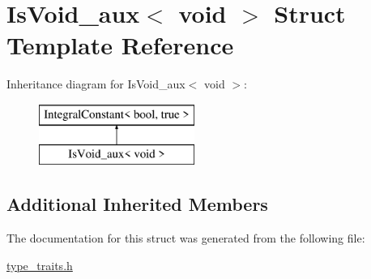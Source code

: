\hypertarget{struct_is_void__aux_3_01void_01_4}{}\section{Is\+Void\+\_\+aux$<$ void $>$ Struct Template Reference}
\label{struct_is_void__aux_3_01void_01_4}
Inheritance diagram for Is\+Void\+\_\+aux$<$ void $>$\+:\begin{figure}[H]
\begin{center}
\leavevmode
\includegraphics[height=2.000000cm]{struct_is_void__aux_3_01void_01_4}
\end{center}
\end{figure}
\subsection*{Additional Inherited Members}


The documentation for this struct was generated from the following file\+:\begin{DoxyCompactItemize}
\item 
\hyperlink{type__traits_8h}{type\+\_\+traits.\+h}\end{DoxyCompactItemize}

